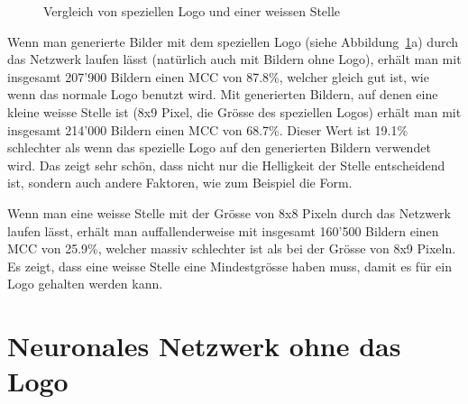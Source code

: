 \documentclass[12pt,a4paper]{report}
\begin{document}
\begin{figure}[h]%
    \centering
    \qquad
    \caption{Vergleich von speziellen Logo und einer weissen Stelle}
    \label{fig:white_square}%
\end{figure}

Wenn man generierte Bilder mit dem speziellen Logo (siehe Abbildung~\ref{fig:white_square}a) durch das Netzwerk laufen lässt (natürlich auch mit Bildern ohne Logo),
erhält man mit insgesamt 207'900 Bildern einen MCC von 87.8\%,
welcher gleich gut ist, wie wenn das normale Logo benutzt wird.
Mit generierten Bildern, auf denen eine kleine weisse Stelle ist (8x9 Pixel, die Grösse des speziellen Logos)
erhält man mit insgesamt 214'000 Bildern einen MCC von 68.7\%.
Dieser Wert ist 19.1\% schlechter als wenn das spezielle Logo auf den generierten Bildern verwendet wird.
Das zeigt sehr schön, dass nicht nur die Helligkeit der Stelle entscheidend ist, sondern auch andere Faktoren, wie zum Beispiel die Form.

Wenn man eine weisse Stelle mit der Grösse von 8x8 Pixeln durch das Netzwerk laufen lässt,
erhält man auffallenderweise mit insgesamt 160'500 Bildern einen MCC von 25.9\%,
welcher massiv schlechter ist als bei der Grösse von 8x9 Pixeln.
Es zeigt, dass eine weisse Stelle eine Mindestgrösse haben muss, damit es für ein Logo gehalten werden kann.

\section{Neuronales Netzwerk ohne das Logo}
\end{document}
